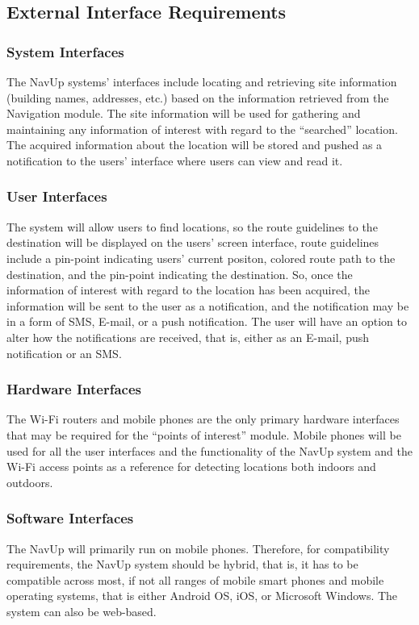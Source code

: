 \subsection{External Interface Requirements}
\subsubsection{System Interfaces}
The NavUp systems’ interfaces include locating and retrieving site information (building names, addresses, etc.) based on the information retrieved from the Navigation module. The site information will be used for gathering and maintaining any information of interest with regard to the “searched” location. The acquired information about the location will be stored and pushed as a notification to the users’ interface where users can view and read it.

\subsubsection{User Interfaces}
The system will allow users to find locations, so the route guidelines to the destination will be displayed on the users’ screen interface, route guidelines include a pin-point indicating users’ current positon, colored route path to the destination, and the pin-point indicating the destination. So, once the information of interest with regard to the location has been acquired, the information will be sent to the user as a notification, and the notification may be in a form of SMS, E-mail, or a push notification. The user will have an option to alter how the notifications are received, that is, either as an E-mail, push notification or an SMS.

\subsubsection{Hardware Interfaces}
The Wi-Fi routers and mobile phones are the only primary hardware interfaces that may be required for the “points of interest” module. Mobile phones will be used for all the user interfaces and the functionality of the NavUp system and the Wi-Fi access points as a reference for detecting locations both indoors and outdoors.

\subsubsection{Software Interfaces}
The NavUp will primarily run on mobile phones. Therefore, for compatibility requirements, the NavUp system should be hybrid, that is, it has to be compatible across most, if not all ranges of mobile smart phones and mobile operating systems, that is either Android OS, iOS, or Microsoft Windows. The system can also be web-based.

